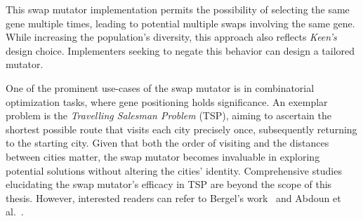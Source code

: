   \begin{remark}
    This swap mutator implementation permits the possibility of selecting the 
    same gene multiple times, leading to potential multiple swaps involving the 
    same gene. While increasing the population's diversity, this approach also 
    reflects \textit{Keen's} design choice. Implementers seeking to negate this 
    behavior can design a tailored mutator.
  \end{remark}

  One of the prominent use-cases of the swap mutator is in combinatorial 
  optimization tasks, where gene positioning holds significance. An exemplar 
  problem is the \textit{Travelling Salesman Problem} (TSP), aiming to 
  ascertain the shortest possible route that visits each city precisely once, 
  subsequently returning to the starting city. Given that both the order of 
  visiting and the distances between cities matter, the swap mutator becomes 
  invaluable in exploring potential solutions without altering the cities' 
  identity. Comprehensive studies elucidating the swap mutator's efficacy in 
  TSP are beyond the scope of this thesis. However, interested readers can 
  refer to Bergel's work~\autocite{bergelAgileArtificialIntelligence2020} and 
  Abdoun et al.~\autocite{abdounAnalyzingPerformanceMutation2012}.
